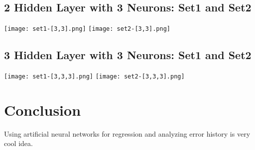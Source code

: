 \documentclass[conference]{IEEEtran}
\begin{document}
    \subsection{2 Hidden Layer with 3 Neurons: Set1 and Set2}

    \texttt{[image: set1-[3,3].png]}
    \texttt{[image: set2-[3,3].png]}

    \subsection{3 Hidden Layer with 3 Neurons: Set1 and Set2}

    \texttt{[image: set1-[3,3,3].png]}
    \texttt{[image: set2-[3,3,3].png]}



    \section{Conclusion}
    Using artificial neural networks for regression and analyzing error history is very cool idea.
\end{document}
